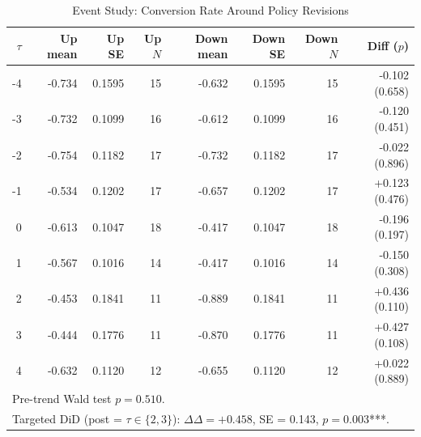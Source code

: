 \begin{table}[htbp]
\caption{Event Study: Conversion Rate Around Policy Revisions}
\label{tab:eventstudy}
\small
\begin{tabular}{rrrrrrrr}
\toprule
$\tau$ & Up mean & Up SE & Up $N$ & Down mean & Down SE & Down $N$ & Diff ($p$) \\
\midrule
  -4 & -0.734 & 0.1595 & 15 & -0.632 & 0.1595 & 15 & -0.102 (0.658) \\
  -3 & -0.732 & 0.1099 & 16 & -0.612 & 0.1099 & 16 & -0.120 (0.451) \\
  -2 & -0.754 & 0.1182 & 17 & -0.732 & 0.1182 & 17 & -0.022 (0.896) \\
  -1 & -0.534 & 0.1202 & 17 & -0.657 & 0.1202 & 17 & +0.123 (0.476) \\
  0 & -0.613 & 0.1047 & 18 & -0.417 & 0.1047 & 18 & -0.196 (0.197) \\
  1 & -0.567 & 0.1016 & 14 & -0.417 & 0.1016 & 14 & -0.150 (0.308) \\
  2 & -0.453 & 0.1841 & 11 & -0.889 & 0.1841 & 11 & +0.436 (0.110) \\
  3 & -0.444 & 0.1776 & 11 & -0.870 & 0.1776 & 11 & +0.427 (0.108) \\
  4 & -0.632 & 0.1120 & 12 & -0.655 & 0.1120 & 12 & +0.022 (0.889) \\
\bottomrule
\multicolumn{8}{l}{\footnotesize Pre-trend Wald test $p=0.510$.}\\
\multicolumn{8}{l}{\footnotesize Targeted DiD (post = $\tau \in \{2,3\}$): $\Delta\Delta = +0.458$, SE = 0.143, $p = 0.003$***.}\\
\end{tabular}
\end{table}